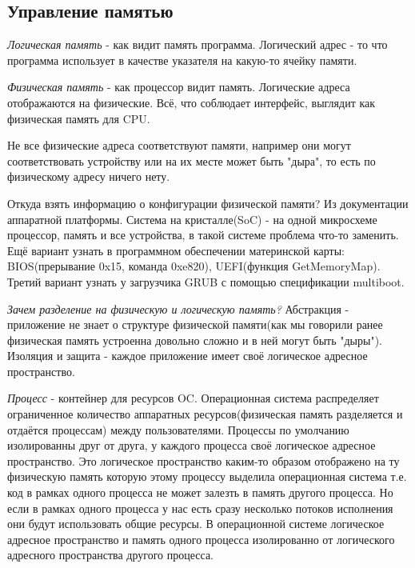 	\subsection{Управление памятью}
	
	\par \textit{Логическая память} - как видит память программа. Логический адрес - то что программа использует в качестве указателя на какую-то ячейку памяти.
	
	\par \textit{Физическая память} - как процессор видит память. Логические адреса отображаются на физические. Всё, что соблюдает интерфейс, выглядит как физическая память для CPU. 
	
	\par Не все физические адреса соответствуют памяти, например они могут соответствовать устройству или на их месте может быть "дыра", то есть по физическому адресу ничего нету.
	
	\par Откуда взять информацию о конфигурации физической памяти? Из документации аппаратной платформы. Система на кристалле(SoC) - на одной микросхеме процессор, память и все устройства, в такой системе проблема что-то заменить. Ещё вариант узнать в программном обеспечении материнской карты: BIOS(прерывание 0x15, команда 0xe820), UEFI(функция GetMemoryMap). Третий вариант узнать у загрузчика GRUB с помощью спецификации multiboot.
	
	\par \textit{Зачем разделение на физическую и логическую память?} Абстракция - приложение не знает о структуре физической памяти(как мы говорили ранее физическая память устроенна довольно сложно и в ней могут быть "дыры"). Изоляция и защита - каждое приложение имеет своё логическое адресное пространство.
	
	\par \textit{Процесс} - контейнер для ресурсов OC. Операционная система распределяет ограниченное количество аппаратных ресурсов(физическая память разделяется и отдаётся процессам) между пользователями. Процессы по умолчанию изолированны друг от друга, у каждого процесса своё логическое адресное пространство. Это логическое пространство каким-то образом отображено на ту физическую память которую этому процессу выделила операционная система т.е. код в рамках одного процесса не может залезть в память другого процесса. Но если в рамках одного процесса у нас есть сразу несколько потоков исполнения они будут использовать общие ресурсы. В операционной системе логическое адресное пространство и память одного процесса изолированно от логического адресного пространства другого процесса.
	
